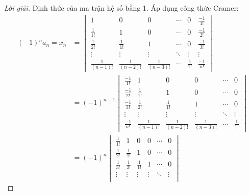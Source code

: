 \begin{proof}[Lời giải]
    Định thức của ma trận hệ số bằng 1. Áp dụng công thức Cramer:
    \begin{align*}
        (-1){}^{n}a_{n} = x_{n}   & =
        \begin{vmatrix}
            1                & 0                & 0                & \cdots & 0            & \frac{-1}{1!} \\
            \frac{1}{1!}     & 1                & 0                & \cdots & 0            & \frac{-1}{2!} \\
            \frac{1}{2!}     & \frac{1}{1!}     & 1                & \cdots & 0            & \frac{-1}{3!} \\
            \vdots           & \vdots           & \vdots           & \ddots & \vdots       & \vdots        \\
            \frac{1}{(n-1)!} & \frac{1}{(n-2)!} & \frac{1}{(n-3)!} & \cdots & \frac{1}{1!} & \frac{-1}{n!}
        \end{vmatrix} \\
                                  & = {(-1)}^{n-1}
        \begin{vmatrix}
            \frac{-1}{1!} & 1                & 0                & 0                & \cdots & 0            \\
            \frac{-1}{2!} & \frac{1}{1!}     & 1                & 0                & \cdots & 0            \\
            \frac{-1}{3!} & \frac{1}{2!}     & \frac{1}{1!}     & 1                & \cdots & 0            \\
            \vdots        & \vdots           & \vdots           & \vdots           & \ddots & \vdots       \\
            \frac{-1}{n!} & \frac{1}{(n-1)!} & \frac{1}{(n-2)!} & \frac{1}{(n-3)!} & \cdots & \frac{1}{1!}
        \end{vmatrix} \\
                                  & = {(-1)}^{n}
        \begin{vmatrix}
            \frac{1}{1!} & 1                & 0                & 0                & \cdots & 0            \\
            \frac{1}{2!} & \frac{1}{1!}     & 1                & 0                & \cdots & 0            \\
            \frac{1}{3!} & \frac{1}{2!}     & \frac{1}{1!}     & 1                & \cdots & 0            \\
            \vdots       & \vdots           & \vdots           & \vdots           & \ddots & \vdots       \\

\end{vmatrix}
\end{align*}
\end{proof}
